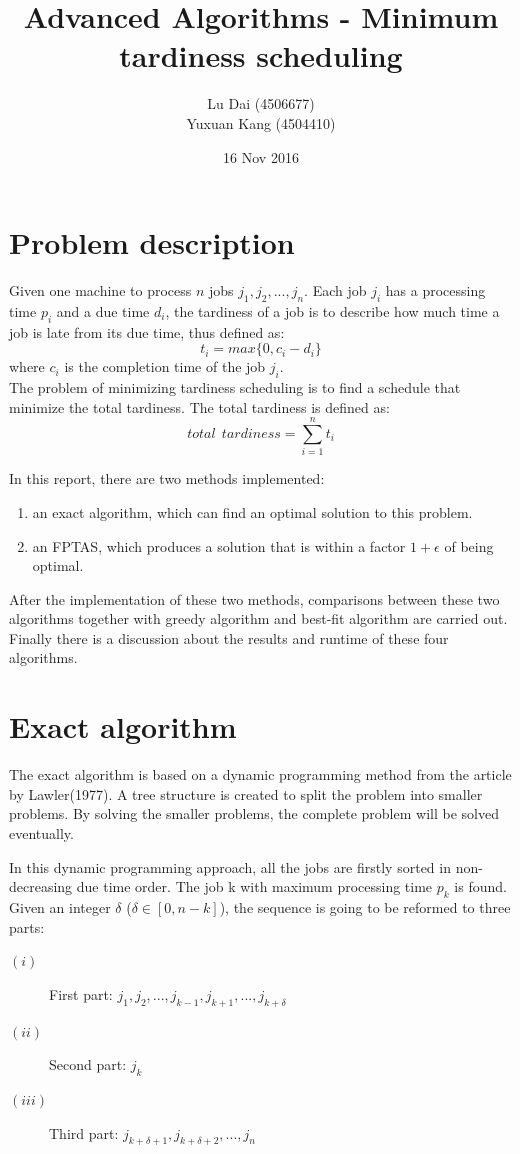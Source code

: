 \documentclass[11pt]{article}
\title{\textbf{Advanced Algorithms - Minimum tardiness scheduling}}
\author{Lu Dai (4506677)\\
		Yuxuan Kang (4504410)\\}
\date{16 Nov 2016}
\begin{document}
\maketitle

\makeatletter
\def\BState{\State\hskip-\ALG@thistlm}
\makeatother
\section{Problem description}
Given one machine to process $n$ jobs $j_1, j_2,...,j_n$. Each job $j_i$ has a processing time $p_i$ and a due time $d_i$, the tardiness of a job is to describe how much time a job is late from its due time, thus defined as:
$$t_i=max\{0,c_i-d_i\}$$
where $c_i$ is the completion time of the job $j_i$.\\
The problem of minimizing tardiness scheduling is to find a schedule that minimize the total tardiness. The total tardiness is defined as:
$$total\ \ tardiness=\sum_{i=1}^n t_i$$ 

In this report, there are two methods implemented:
\begin{enumerate}
\item an exact algorithm, which can find an optimal solution to this problem.
\item an FPTAS, which produces a solution that is within a factor $1+\epsilon$ of being optimal.	
\end{enumerate}

After the implementation of these two methods, comparisons between these two algorithms together with greedy algorithm and best-fit algorithm are carried out. Finally there is a discussion about the results and runtime of these four algorithms.

\section{Exact algorithm}\label{Exact algorithm}
The exact algorithm is based on a dynamic programming method from the article by Lawler(1977). A tree structure is created to split the problem into smaller problems. By solving the smaller problems, the complete problem will be solved eventually.

In this dynamic programming approach, all the jobs are firstly sorted in non-decreasing due time order. The job k with maximum processing time $p_k$ is found. Given an integer $\delta$ ($\delta \in [0,n-k]$), the sequence is going to be reformed to three parts: 

\begin{description}
\item[$(i)$]First part: $j_1,j_2,...,j_{k-1},j_{k+1},...,j_{k+\delta }$
\item[$(ii)$]Second part: $j_k$
\item[$(iii)$]Third part: $j_{k+\delta +1},j_{k+\delta +2},...,j_n$
\end{description}
\end{document}

